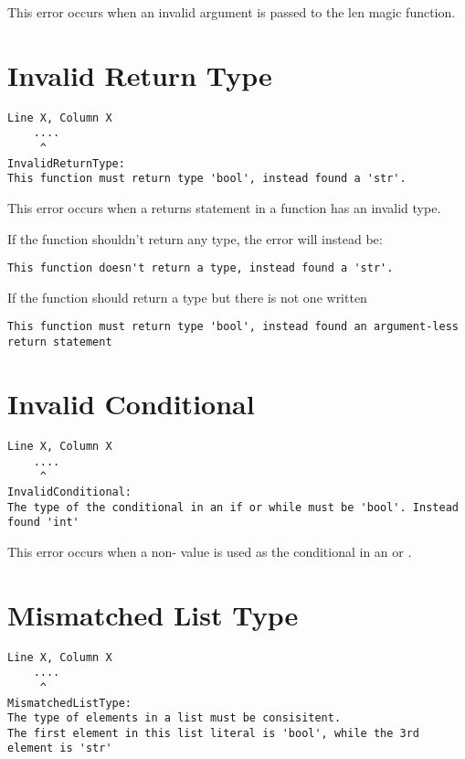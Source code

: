 This error occurs when an invalid argument is passed to the len magic function.

\section{Invalid Return Type}
\begin{lstlisting}[breaklines]
Line X, Column X
    ....
     ^
InvalidReturnType:
This function must return type 'bool', instead found a 'str'.
\end{lstlisting}

This error occurs when a returns statement in a function has an invalid type.

If the function shouldn't return any type, the error will instead be:

\begin{lstlisting}[breaklines]
This function doesn't return a type, instead found a 'str'.
\end{lstlisting}

If the function should return a type but there is not one written

\begin{lstlisting}[breaklines]
This function must return type 'bool', instead found an argument-less return statement
\end{lstlisting}

\section{Invalid Conditional}
\begin{lstlisting}[breaklines]
Line X, Column X
    ....
     ^
InvalidConditional:
The type of the conditional in an if or while must be 'bool'. Instead found 'int'
\end{lstlisting}

This error occurs when a non- value is used as the conditional in an
 or .

\section{Mismatched List Type}
\begin{lstlisting}[breaklines]
Line X, Column X
    ....
     ^
MismatchedListType:
The type of elements in a list must be consisitent.
The first element in this list literal is 'bool', while the 3rd element is 'str'
\end{lstlisting}

